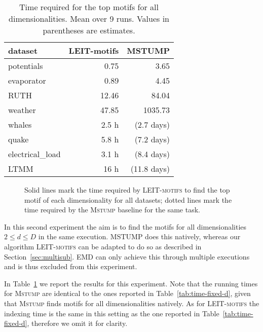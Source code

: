 \begin{table}[t]
\caption{Time required for the top motifs for all dimensionalities. Mean over 9 runs. Values in parentheses are estimates.
}
\centering
\begin{tabular}{lrr}
\toprule
dataset    & LEIT-motifs  & MSTUMP      \\
\midrule
potentials &  0.75  & 3.65   \\
evaporator &  0.89  & 4.45 \\
RUTH &  12.46  & 84.04 \\
weather   &  47.85   & 1035.73 \\ 
whales   &  2.5 h  &  (2.7 days) \\ 
quake    & 5.8 h  &(7.2 days)\\ 
electrical\_load    &  3.1 h   & (8.4 days)\\ 
LTMM    &  16 h & (11.8 days) \\
\bottomrule
\end{tabular}
\label{tab:time-multi-d}
\end{table}

\begin{figure}
    \centering
    \caption{Solid lines mark the time required by \textsc{LEIT-motifs} to find the top motif of each dimensionality for all datasets; dotted lines mark the time required by the \textsc{Mstump} baseline for the same task.}
    \label{fig:multisub}
\end{figure}

In this second experiment the aim is to find the motifs for all dimensionalities $2\le d \le D$ in the same execution.
MSTUMP does this natively, whereas our algorithm \textsc{LEIT-motifs} can be adapted to do so as described in Section~\ref{sec:multisub}. EMD can only achieve this through multiple executions and is thus excluded from this experiment.

In Table~\ref{tab:time-multi-d} we report the results for this experiment.
Note that the running times for \textsc{Mstump} are identical to the ones reported in Table~\ref{tab:time-fixed-d}, given that \textsc{Mstump} finds motifs for all dimensionalities natively.
As for \textsc{LEIT-motifs} the indexing time is the same in this setting as the one reported in Table~\ref{tab:time-fixed-d}, therefore we omit it for clarity.

